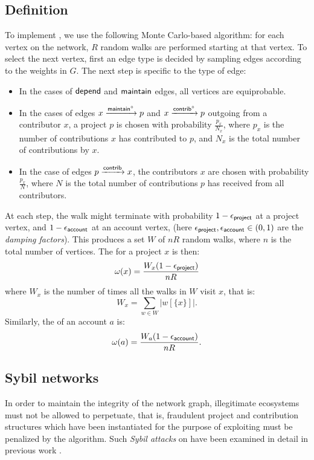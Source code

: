 \subsection{Definition}

To implement \osrank{}, we use the following Monte Carlo-based algorithm: for
each vertex on the network, $R$ random walks are performed starting at that
vertex. To select the next vertex, first an edge type is decided
by sampling edges according to the weights in $G$. The next step is specific to
the type of edge:

\begin{itemize}
\item In the cases of $\mathsf{depend}$ and $\mathsf{maintain}$ edges, all vertices are equiprobable.
\item In the cases of edges $x \xrightarrow[]{\mathsf{maintain}^\circ} p$ and
  $x \xrightarrow[]{\mathsf{contrib}^\circ} p$ outgoing from a contributor $x$, a project $p$ is
  chosen with probability $\frac{p_x}{N_x}$, where $p_x$ is the number of
  contributions $x$ has contributed to $p$, and $N_x$ is the total number of
  contributions by $x$.
\item In the case of edges $p \xrightarrow[]{\mathsf{contrib}} x$, the contributors $x$ are
  chosen with probability $\frac{p_x}{N}$, where $N$ is the total number of
  contributions $p$ has received from all contributors.
\end{itemize}

\noindent At each step, the walk might terminate with probability $1 - \epsilon_{\mathsf{project}}$ at a
project vertex, and $1 - \epsilon_{\mathsf{account}}$ at an account vertex, (here
$\epsilon_{\mathsf{project}}, \epsilon_{\mathsf{account}} \in (0,1)$ are the \emph{damping factors}). This
produces a set $W$ of $nR$ random walks, where $n$ is the total number of
vertices. The \osrank{} for a project $x$ is then:
\[
  \omega(x) = \frac{W_x (1-\epsilon_{\mathsf{project}})}{n R}
\]
where $W_x$ is the number of times all the walks in $W$ visit $x$, that is:
\[
  W_x = \sum_{w \in W} |w[\{x\}]|.
\]
Similarly, the \osrank{} of an account $a$ is:
\[
  \omega(a) = \frac{W_a (1-\epsilon_{\mathsf{account}})}{n R}.
\]

\subsection{Sybil networks}

In order to maintain the integrity of the \oscoin{} network graph, illegitimate
ecosystems must not be allowed to perpetuate, that is, fraudulent project and
contribution structures which have been instantiated for the purpose of
exploiting \osrank{} must be penalized by the algorithm.  Such \emph{Sybil attacks}
on \pagerank{} have been examined in detail in previous work
\cite{pagerank-sybil}.

